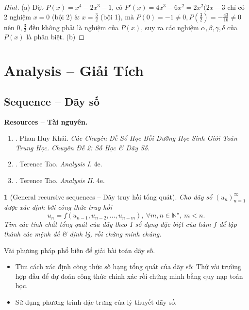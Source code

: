 \documentclass{article}
\newtheorem{baitoan}{}
\begin{document}
\begin{proof}[Hint]
	(a) Đặt $P(x) = x^4 - 2x^3 - 1$, có $P'(x) = 4x^3 - 6x^2 = 2x^2(2x - 3$ chỉ có 2 nghiệm $x = 0$ (bội 2) \& $x = \frac{3}{2}$ (bội 1), mà $P(0) = -1\ne0,P(\frac{3}{2}) = -\frac{43}{16}\ne0$ nên $0,\frac{3}{2}$ đều không phải là nghiệm của $P(x)$, suy ra các nghiệm $\alpha,\beta,\gamma,\delta$ của $P(x)$ là phân biệt. (b) 
\end{proof}


\section{Analysis -- Giải Tích}

\subsection{Sequence -- Dãy số}
\textbf{\textsf{Resources -- Tài nguyên.}}
\begin{enumerate}
	\item \cite{Khai_so_hoc_day_so}. {\sc Phan Huy Khải}. {\it Các Chuyên Đề Số Học Bồi Dưỡng Học Sinh Giỏi Toán Trung Học. Chuyên Đề 2: Số Học \& Dãy Số}.
	\item \cite{Tao_analysis_1}. {\sc Terence Tao}. {\it Analysis I}. 4e.
	\item \cite{Tao_analysis_2}. {\sc Terence Tao}. {\it Analysis II}. 4e.
\end{enumerate}

\begin{baitoan}[General recursive sequences -- Dãy truy hồi tổng quát]
	Cho dãy số $(u_n)_{n=1}^\infty$ được xác định bởi công thức truy hồi
	\begin{equation}
		\boxed{u_n = f(u_{n-1},u_{n-2},\ldots,u_{n-m}),\ \forall m,n\in\mathbb{N}^\star,\ m < n.}
	\end{equation}
	Tìm các tính chất tổng quát của dãy theo 1 số dạng đặc biệt của hàm $f$ để lập thành các mệnh đề \& định lý, rồi chứng minh chúng.
\end{baitoan}
{\sf Vài phương pháp phổ biến để giải bài toán dãy số.}
\begin{itemize}
	\item Tìm cách xác định công thức số hạng tổng quát của dãy số: Thử vài trường hợp đầu để dự đoán công thức chính xác rồi chứng minh bằng quy nạp toán học.
	\item Sử dụng phương trình đặc trưng của lý thuyết dãy số.
\end{itemize}
\end{document}
